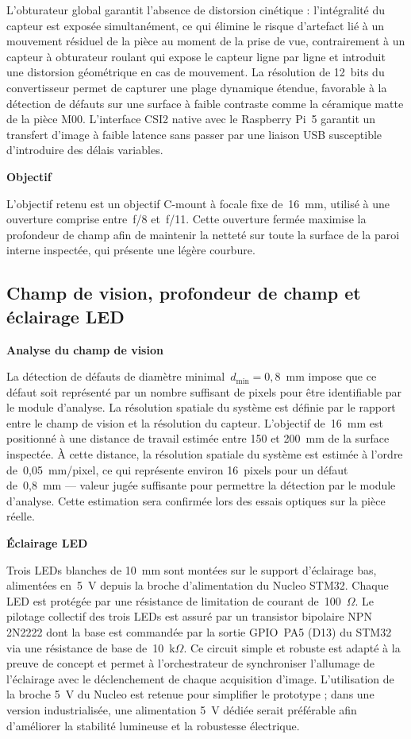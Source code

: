 L'obturateur global garantit l'absence de distorsion cinétique : l'intégralité du capteur 
est exposée simultanément, ce qui élimine le risque d'artefact lié à un mouvement résiduel 
de la pièce au moment de la prise de vue, contrairement à un capteur à obturateur roulant 
qui expose le capteur ligne par ligne et introduit une distorsion géométrique en cas de 
mouvement. La résolution de 12~bits du convertisseur permet de capturer une plage dynamique 
étendue, favorable à la détection de défauts sur une surface à faible contraste comme la 
céramique matte de la pièce M00. L'interface CSI2 native avec le Raspberry Pi~5 garantit 
un transfert d'image à faible latence sans passer par une liaison USB susceptible 
d'introduire des délais variables.

\medskip
\noindent\textbf{Objectif}

L'objectif retenu est un objectif C-mount à focale fixe de~16~mm, utilisé à une ouverture
comprise entre~f/8 et~f/11. Cette ouverture fermée maximise la profondeur de champ afin
de maintenir la netteté sur toute la surface de la paroi interne inspectée, qui présente
une légère courbure.

\subsection{Champ de vision, profondeur de champ et éclairage LED}

\noindent\textbf{Analyse du champ de vision}

La détection de défauts de diamètre minimal~$d_{\min} = 0{,}8$~mm impose que ce défaut soit
représenté par un nombre suffisant de pixels pour être identifiable par le module d'analyse.
La résolution spatiale du système est définie par le rapport entre le champ de vision et la
résolution du capteur. L'objectif de~16~mm est positionné à une distance de travail estimée entre 150 et 200~mm 
de la surface inspectée. À cette distance, la résolution spatiale du système est estimée 
à l'ordre de~0,05~mm/pixel, ce qui représente environ 16~pixels pour un défaut de~0,8~mm 
— valeur jugée suffisante pour permettre la détection par le module d'analyse. Cette 
estimation sera confirmée lors des essais optiques sur la pièce réelle.

\medskip
\noindent\textbf{Éclairage LED}

Trois LEDs blanches de 10~mm sont montées sur le support d'éclairage bas, alimentées en~5~V
depuis la broche d'alimentation du Nucleo STM32. Chaque LED est protégée par une résistance
de limitation de courant de~100~$\Omega$. Le pilotage collectif des trois LEDs est assuré par
un transistor bipolaire NPN 2N2222 dont la base est commandée par la sortie GPIO~PA5 (D13)
du STM32 via une résistance de base de~10~k$\Omega$. Ce circuit simple et robuste est adapté à la preuve de concept et permet à
l'orchestrateur de synchroniser l'allumage de l'éclairage avec le déclenchement de chaque
acquisition d'image. L'utilisation de la broche 5~V du Nucleo est retenue pour simplifier le
prototype ; dans une version industrialisée, une alimentation 5~V dédiée serait préférable
afin d'améliorer la stabilité lumineuse et la robustesse électrique.

